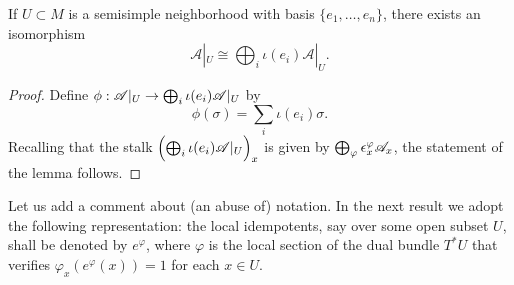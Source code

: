 \begin{lemma}\label{iota_decomposition}
If $U\subset M$ is a semisimple neighborhood with basis $\{e_1,\dots ,e_n\}$, there exists an isomorphism
$$\mathscr{A}|_U\cong \bigoplus_i\iota (e_i)\mathscr{A}|_U.$$
\end{lemma}
\begin{proof}
Define $\phi :\mathscr{A}|_U\to \bigoplus_i\iota (e_i)\mathscr{A}|_U$ by
$$\phi (\sigma )=\sum_i\iota (e_i)\sigma .$$
Recalling that the stalk $\Bigl (\bigoplus_i\iota (e_i)\mathscr{A}|_U\Bigr )_x$ is given by $\bigoplus_{\varphi}\epsilon^{\varphi}_x\mathscr{A}_x$, the statement of the lemma follows.
\end{proof}

\begin{obs}
Let us add a comment about (an abuse of) notation. In the next result we adopt the following representation: the local idempotents, say over some open subset $U$, shall be denoted by $e^\varphi$, where $\varphi$ is the local section of the dual bundle $T^*U$ that verifies $\varphi_x(e^\varphi (x))=1$ for each $x\in U$.
\end{obs}

